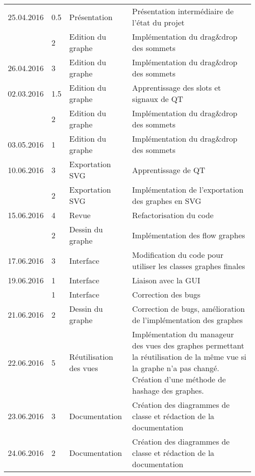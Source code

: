 \documentclass[french]{article}
\begin{document}
\begin{tabular}{p{}|p{}|p{}|p{}}
		\hline
		25.04.2016 & 0.5 & Présentation & Présentation intermédiaire de l'état du projet \\
		           & 2 & Edition du graphe & Implémentation du drag\&drop des sommets \\
		\hline
		26.04.2016 & 3 & Edition du graphe & Implémentation du drag\&drop des sommets \\
		\hline
		02.03.2016 & 1.5 & Edition du graphe & Apprentissage des slots et signaux de QT \\		 
		           & 2 & Edition du graphe & Implémentation du drag\&drop des sommets \\
		\hline
		03.05.2016 & 1 & Edition du graphe & Implémentation du drag\&drop des sommets \\
		\hline
		10.06.2016 & 3 & Exportation SVG & Apprentissage de QT \\
		           & 2 & Exportation SVG & Implémentation de l'exportation des graphes en SVG \\
		\hline
		15.06.2016 & 4 & Revue & Refactorisation du code \\
				   & 2 & Dessin du graphe & Implémentation des flow graphes \\
		\hline
		17.06.2016 & 3 & Interface & Modification du code pour utiliser les classes graphes finales \\
		\hline
		19.06.2016 & 1 & Interface & Liaison avec la GUI \\
				   & 1 & Interface & Correction des bugs \\
		\hline
		21.06.2016 & 2 & Dessin du graphe & Correction de bugs, amélioration de l'implémentation des graphes \\
		\hline
		22.06.2016 & 5 & Réutilisation des vues & Implémentation du manageur des vues des graphes permettant la réutilisation de la même vue si la graphe n'a pas changé. Création d'une méthode de hashage des graphes. \\
		\hline
		23.06.2016 & 3 & Documentation & Création des diagrammes de classe et rédaction de la documentation \\
		\hline
		24.06.2016 & 2 & Documentation & Création des diagrammes de classe et rédaction de la documentation \\
		\hline
	\end{tabular}
	
\end{document}
